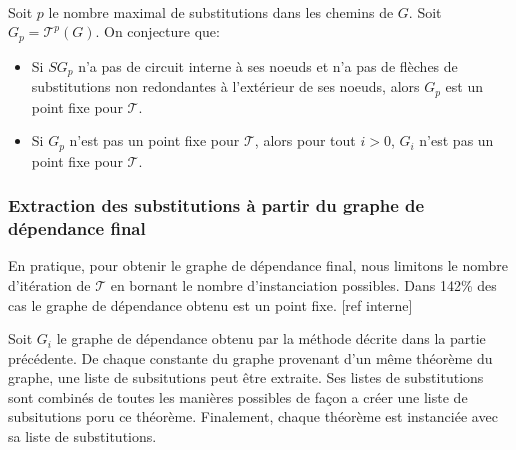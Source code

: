 \begin{conjecture}
\\Soit $p$ le nombre maximal de substitutions dans les chemins de $G$. Soit $G_p = \mathcal{T}^p(G)$. On conjecture que:
\begin{itemize}
\item Si $SG_p$ n'a pas de circuit interne à ses noeuds et n'a pas de flèches de substitutions non redondantes à l'extérieur de ses noeuds, alors $G_p$ est un point fixe pour $\mathcal{T}$. 
\item Si $G_p$ n'est pas un point fixe pour $\mathcal{T}$, alors pour tout $i>0$, $G_i$ n'est pas un point fixe pour $\mathcal{T}$.
\end{itemize}
\end{conjecture} 

\subsubsection{Extraction des substitutions à partir du graphe de dépendance final}

\par En pratique, pour obtenir le graphe de dépendance final, nous limitons le nombre d'itération de $\mathcal{T}$ en bornant le nombre d'instanciation possibles. Dans {\color{red}142}\% des cas le graphe de dépendance obtenu est un point fixe. [ref interne]
\par Soit $G_i$ le graphe de dépendance obtenu par la méthode décrite dans la partie précédente. De chaque constante du graphe provenant d'un m\^eme théorème du graphe, une liste de subsitutions peut \^etre extraite. Ses listes de substitutions sont combinés de toutes les manières possibles de façon a créer une liste de subsitutions poru ce théorème. Finalement, chaque théorème est instanciée avec sa liste de substitutions. 



